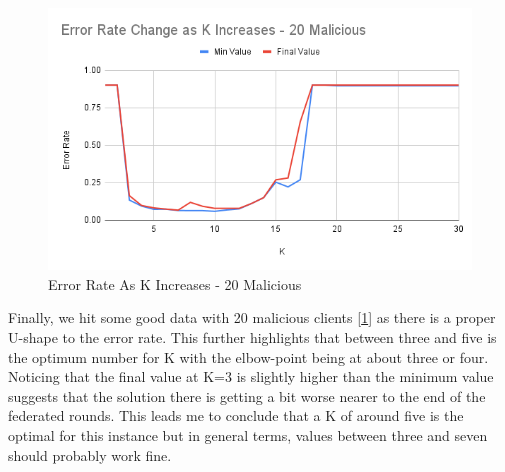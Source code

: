 \begin{figure}[htbp]
	\centering
    \includegraphics[scale=0.55]{my_agg/graphs/k_elbow_20.png}
	\caption{Error Rate As K Increases - 20 Malicious}
	\label{fig:k_elbow_20}
\end{figure}

Finally, we hit some good data with 20 malicious clients [\ref{fig:k_elbow_20}] as there is a proper U-shape to the error rate.
This further highlights that between three and five is the optimum number for K with the elbow-point being at about three or four.
Noticing that the final value at K=3 is slightly higher than the minimum value suggests that the solution there is getting a bit worse nearer to the end of the federated rounds.
This leads me to conclude that a K of around five is the optimal for this instance but in general terms, values between three and seven should probably work fine.



